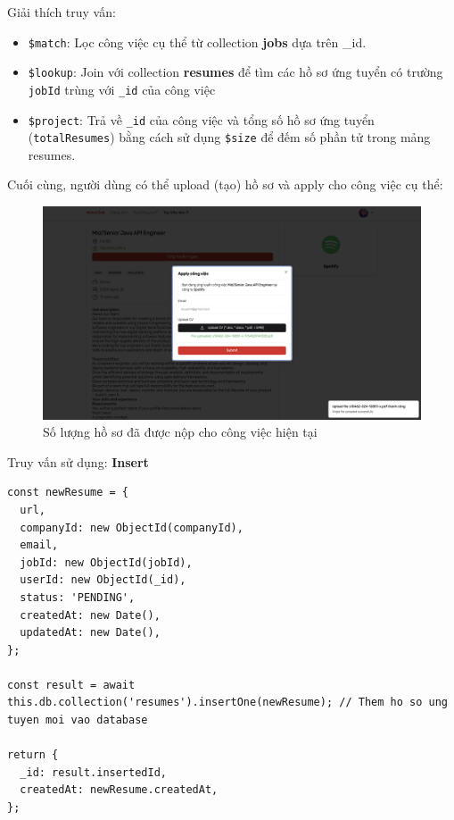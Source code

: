 Giải thích truy vấn:
\begin{itemize}
    \item \texttt{\$match}: Lọc công việc cụ thể từ collection \textbf{jobs} dựa trên \_id.
    \item \texttt{\$lookup}: Join với collection \textbf{resumes} để tìm các hồ sơ ứng tuyển có trường \texttt{jobId} trùng với \texttt{\_id} của công việc
    \item \texttt{\$project}: Trả về \texttt{\_id} của công việc và tổng số hồ sơ ứng tuyển (\texttt{totalResumes}) bằng cách sử dụng \texttt{\$size} để đếm số phần tử trong mảng resumes.
\end{itemize}

Cuối cùng, người dùng có thể upload (tạo) hồ sơ và apply cho công việc cụ thể:

\begin{figure}[H]
    \centering
    \includegraphics[width=\linewidth]{DBMS-Application/Images/modal-upload-cv.png}
    \caption{Số lượng hồ sơ đã được nộp cho công việc hiện tại}
\end{figure}

Truy vấn sử dụng: \textbf{Insert}

\begin{lstlisting}
const newResume = {
  url,
  companyId: new ObjectId(companyId),
  email,
  jobId: new ObjectId(jobId),
  userId: new ObjectId(_id),
  status: 'PENDING',
  createdAt: new Date(),
  updatedAt: new Date(),
};

const result = await this.db.collection('resumes').insertOne(newResume); // Them ho so ung tuyen moi vao database

return {
  _id: result.insertedId,
  createdAt: newResume.createdAt,
};

\end{lstlisting}
